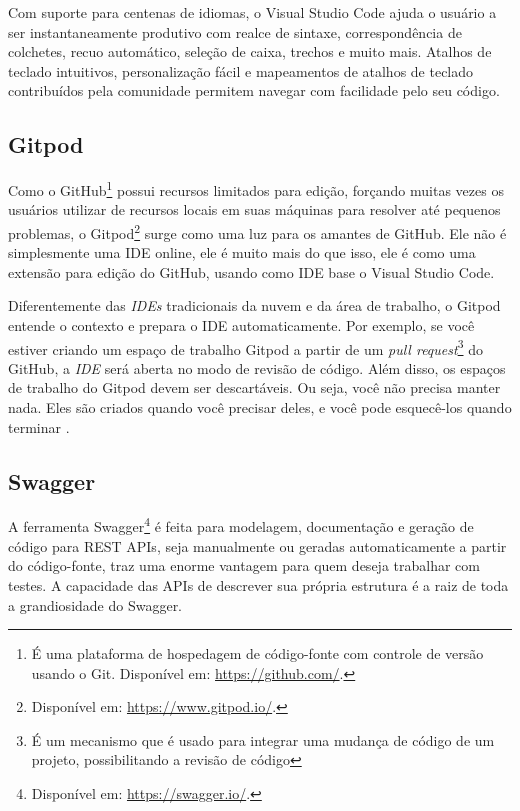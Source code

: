 Com suporte para centenas de idiomas, o Visual Studio Code ajuda o usuário a ser instantaneamente produtivo com realce de sintaxe, correspondência de colchetes, recuo automático, seleção de caixa, trechos e muito mais. Atalhos de teclado intuitivos, personalização fácil e mapeamentos de atalhos de teclado contribuídos pela comunidade permitem navegar com facilidade pelo seu código. \cite{microsoft2020VSCode}


\subsection{Gitpod}
\label{ssec:Gitpod}
Como o GitHub\footnote{É uma plataforma de hospedagem de código-fonte com controle de versão usando o Git. Disponível em: \url{https://github.com/}.} possui recursos limitados para edição, forçando muitas vezes os usuários utilizar de recursos locais em suas máquinas para resolver até pequenos problemas, o Gitpod\footnote{Disponível em: \url{https://www.gitpod.io/}.} surge como uma luz para os amantes de GitHub. Ele não é simplesmente uma IDE online, ele é muito mais do que isso, ele é como uma extensão para edição do GitHub, usando como IDE base o Visual Studio Code. 

Diferentemente das \textit{IDEs} tradicionais da nuvem e da área de trabalho, o Gitpod entende o contexto e prepara o IDE automaticamente. Por exemplo, se você estiver criando um espaço de trabalho Gitpod a partir de um \textit{pull request}\footnote{É um mecanismo que é usado para integrar uma mudança de código de um projeto, possibilitando a revisão de código} do GitHub, a \textit{IDE} será aberta no modo de revisão de código. Além disso, os espaços de trabalho do Gitpod devem ser descartáveis. Ou seja, você não precisa manter nada. Eles são criados quando você precisar deles, e você pode esquecê-los quando terminar \cite{typefox2020Gitpod}. 


\subsection{Swagger}
\label{ssec:Swagger}
A ferramenta Swagger\footnote{Disponível em: \url{https://swagger.io/}.} é feita para modelagem, documentação e geração de código para REST APIs, seja manualmente ou geradas automaticamente a partir do código-fonte, traz uma enorme vantagem para quem deseja trabalhar com testes. A capacidade das APIs de descrever sua própria estrutura é a raiz de toda a grandiosidade do Swagger.

